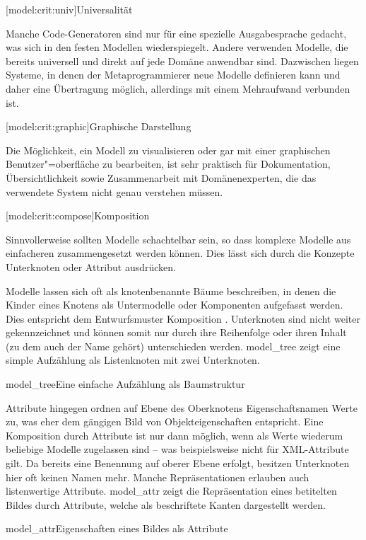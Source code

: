 \documentclass[12pt, a4paper, bibgerm]{scrbook}
\newcommand\lsubsection{}
\newcommand\abb{}
\newcommand\fig{}
\begin{document}
\lsubsection[model:crit:univ]{Universalität} 

Manche Code-Generatoren sind nur für eine spezielle Ausgabesprache
gedacht, was sich in den festen Modellen wiederspiegelt. Andere
verwenden Modelle, die bereits universell und direkt auf jede Domäne
anwendbar sind. Dazwischen liegen Systeme, in denen der
Metaprogrammierer neue Modelle definieren kann und daher eine
Übertragung möglich, allerdings mit einem Mehraufwand
verbunden ist.

\lsubsection[model:crit:graphic]{Graphische Darstellung}

Die Möglichkeit, ein Modell zu visualisieren oder gar mit einer
graphischen Benutzer"=oberfläche zu bearbeiten, ist sehr praktisch für
Dokumentation, Übersichtlichkeit sowie Zusammenarbeit mit
Domänenexperten, die das verwendete System nicht genau verstehen müssen.

\lsubsection[model:crit:compose]{Komposition}

Sinnvollerweise sollten Modelle schachtelbar sein, so dass
komplexe Modelle aus einfacheren zusammengesetzt werden können.
Dies lässt sich durch die Konzepte Unterknoten oder Attribut ausdrücken.

Modelle lassen sich oft als knotenbenannte Bäume beschreiben, in denen
die Kinder eines Knotens als Untermodelle oder Komponenten aufgefasst
werden. Dies entspricht dem Entwurfsmuster
Komposition \cite[S.182f]{CompositePattern}. Unterknoten sind nicht
weiter gekennzeichnet und können somit nur durch ihre Reihenfolge oder
ihren Inhalt (zu dem auch der Name gehört) unterschieden
werden. \abb{model_tree} zeigt eine simple Aufzählung als
Listenknoten mit zwei Unterknoten.

\fig{model_tree}{Eine einfache Aufzählung als Baumstruktur}

Attribute hingegen ordnen auf Ebene des Oberknotens Eigenschaftsnamen
Werte zu, was eher dem gängigen Bild von Objekteigenschaften
entspricht. Eine Komposition durch Attribute ist nur dann möglich, wenn
als Werte wiederum beliebige Modelle zugelassen sind -- was
beispielsweise nicht für XML-Attribute gilt. Da bereits eine Benennung auf
oberer Ebene erfolgt, besitzen Unterknoten hier oft keinen Namen
mehr. Manche Repräsentationen erlauben auch listenwertige
Attribute. \abb{model_attr} zeigt die Repräsentation eines betitelten
Bildes durch Attribute, welche als beschriftete Kanten dargestellt
werden.

\fig{model_attr}{Eigenschaften eines Bildes als Attribute}
\end{document}
